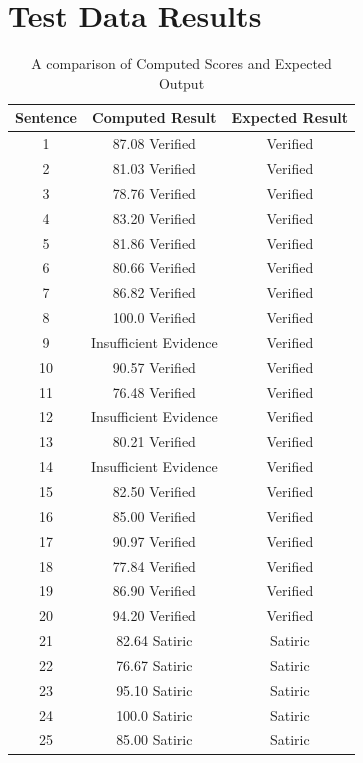 \documentclass[journal]{./IEEEtran}
\begin{document}
    \section{Test Data Results}
    \label{appendix:data}
    \begin{table}[h!]
    \caption{A comparison of Computed Scores and Expected Output}
    	\begin{center}
    		\begin{tabular}{ | c | c | c |} 
    			\hline
    			Sentence & Computed Result & Expected Result\\
    			\hline
    			1 & 87.08 Verified & Verified\\
    			2 & 81.03 Verified & Verified\\
    			3 & 78.76 Verified & Verified\\
    			4 & 83.20 Verified & Verified\\
    			5 & 81.86 Verified & Verified\\
    			6 & 80.66 Verified & Verified\\
    			7 & 86.82 Verified & Verified\\
    			8 & 100.0 Verified & Verified\\
    			9 & Insufficient Evidence & Verified\\
    			10 & 90.57 Verified & Verified\\
    			11 & 76.48 Verified & Verified\\
    			12 & Insufficient Evidence & Verified\\
    			13 & 80.21 Verified & Verified\\
    			14 & Insufficient Evidence & Verified\\
    			15 & 82.50 Verified & Verified\\
    			16 & 85.00 Verified & Verified\\
    			17 & 90.97 Verified & Verified\\
    			18 & 77.84 Verified & Verified\\
    			19 & 86.90 Verified & Verified\\
    			20 & 94.20 Verified & Verified\\
    			21 & 82.64 Satiric & Satiric\\
    			22 & 76.67 Satiric & Satiric\\
    			23 & 95.10 Satiric & Satiric\\
    			24 & 100.0 Satiric & Satiric\\
    			25 & 85.00 Satiric & Satiric\\

\end{tabular}
\end{center}
\end{table}
\end{document}
